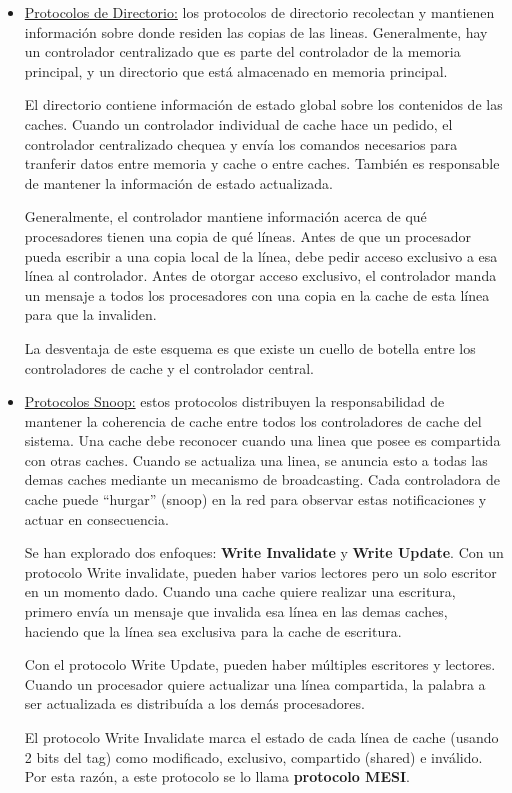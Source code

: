 \begin{itemize}
 \item \underline{Protocolos de Directorio:} los protocolos de directorio recolectan y mantienen informaci\'on sobre donde residen las copias de las lineas.
 Generalmente, hay un controlador centralizado que es parte del controlador de la memoria principal, y un directorio que est\'a almacenado en memoria principal.
 
 El directorio contiene informaci\'on de estado global sobre los contenidos de las caches. Cuando un controlador individual de cache hace un pedido, 
 el controlador centralizado chequea y env\'ia los comandos necesarios para tranferir datos entre memoria y cache o entre caches. Tambi\'en es responsable de mantener
 la informaci\'on de estado actualizada.
 
 Generalmente, el controlador mantiene informaci\'on acerca de qu\'e procesadores tienen una copia de qu\'e l\'ineas. Antes de que un procesador pueda escribir
 a una copia local de la l\'inea, debe pedir acceso exclusivo a esa l\'inea al controlador. Antes de otorgar acceso exclusivo, el controlador manda un mensaje
 a todos los procesadores con una copia en la cache de esta l\'inea para que la invaliden.
 
 La desventaja de este esquema es que existe un cuello de botella entre los controladores de cache y el controlador central.
 
 \item \underline{Protocolos Snoop:} estos protocolos distribuyen la responsabilidad de mantener la coherencia de cache entre todos los controladores
 de cache del sistema. Una cache debe reconocer cuando una linea que posee es compartida con otras caches. Cuando se actualiza una linea, se 
 anuncia esto a todas las demas caches mediante un mecanismo de broadcasting. Cada controladora de cache puede ``hurgar'' (snoop) en la red para
 observar estas notificaciones y actuar en consecuencia.
 
 Se han explorado dos enfoques: \textbf{Write Invalidate} y \textbf{Write Update}. Con un protocolo Write invalidate, pueden haber varios lectores
 pero un solo escritor en un momento dado. Cuando una cache quiere realizar una escritura, primero env\'ia un mensaje que invalida esa l\'inea en las demas
 caches, haciendo que la l\'inea sea exclusiva para la cache de escritura.
 
 Con el protocolo Write Update, pueden haber m\'ultiples escritores y lectores. Cuando un procesador quiere actualizar una l\'inea compartida, la palabra
 a ser actualizada es distribu\'ida a los dem\'as procesadores.
 
 El protocolo Write Invalidate marca el estado de cada l\'inea de cache (usando 2 bits del tag) como modificado, exclusivo, compartido (shared) e inv\'alido.
 Por esta raz\'on, a este protocolo se lo llama \textbf{protocolo MESI}.
\end{itemize}

